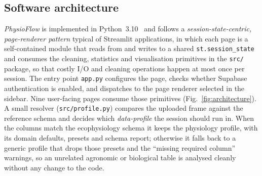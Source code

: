 \documentclass[preprint,12pt,a4paper]{elsarticle}
\begin{document}
\subsection{Software architecture}\label{sec:arch}

\emph{PhysioFlow} is implemented in Python~3.10~\cite{Streamlit,McKinney2010,Harris2020} and follows a \emph{session-state-centric, page-renderer pattern} typical of Streamlit applications, in which each page is a self-contained module that reads from and writes to a shared \texttt{st.session\_state} and consumes the cleaning, statistics and visualisation primitives in the \texttt{src/} package, so that costly I/O and cleaning operations happen at most once per session. The entry point \texttt{app.py} configures the page, checks whether Supabase authentication is enabled, and dispatches to the page renderer selected in the sidebar. Nine user-facing pages consume those primitives (Fig.~\ref{fig:architecture}). A small resolver (\texttt{src/profile.py}) compares the uploaded frame against the reference schema and decides which \emph{data-profile} the session should run in. When the columns match the ecophysiology schema it keeps the physiology profile, with its domain defaults, presets and schema report; otherwise it falls back to a generic profile that drops those presets and the ``missing required column'' warnings, so an unrelated agronomic or biological table is analysed cleanly without any change to the code.
\end{document}
